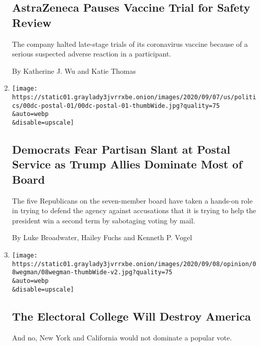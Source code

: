 \begin{enumerate}
  \hypertarget{astrazeneca-pauses-vaccine-trial-for-safety-review}{%
  \subsection{AstraZeneca Pauses Vaccine Trial for Safety
  Review}\label{astrazeneca-pauses-vaccine-trial-for-safety-review}}

  The company halted late-stage trials of its coronavirus vaccine
  because of a serious suspected adverse reaction in a participant.

  By Katherine J. Wu and Katie Thomas
\item
  \href{/2020/09/08/us/politics/democrats-postal-service-board-trump.html}{}

  \texttt{[image: https://static01.graylady3jvrrxbe.onion/images/2020/09/07/us/politics/00dc-postal-01/00dc-postal-01-thumbWide.jpg?quality=75\\\&auto=webp\\\&disable=upscale]}

  \hypertarget{democrats-fear-partisan-slant-at-postal-service-as-trump-allies-dominate-most-of-board}{%
  \subsection{Democrats Fear Partisan Slant at Postal Service as Trump
  Allies Dominate Most of
  Board}\label{democrats-fear-partisan-slant-at-postal-service-as-trump-allies-dominate-most-of-board}}

  The five Republicans on the seven-member board have taken a hands-on
  role in trying to defend the agency against accusations that it is
  trying to help the president win a second term by sabotaging voting by
  mail.

  By Luke Broadwater, Hailey Fuchs and Kenneth P. Vogel
\item
  \href{/2020/09/08/opinion/electoral-college-trump-biden.html}{}

  \texttt{[image: https://static01.graylady3jvrrxbe.onion/images/2020/09/08/opinion/08wegman/08wegman-thumbWide-v2.jpg?quality=75\\\&auto=webp\\\&disable=upscale]}

  \hypertarget{the-electoral-college-will-destroy-america}{%
  \subsection{The Electoral College Will Destroy
  America}\label{the-electoral-college-will-destroy-america}}

  And no, New York and California would not dominate a popular vote.


\end{enumerate}
